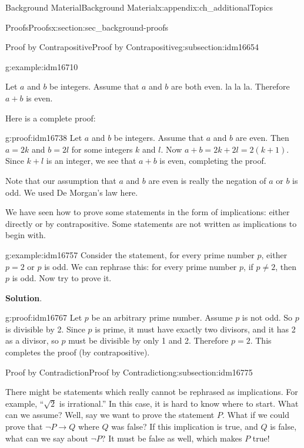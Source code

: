 \documentclass[oneside,10pt,]{book}
\numberwithin{equation}{chapter}
\def\imp{\rightarrow}
\begin{document}
\begin{appendixptx}{Background Material}{}{Background Material}{}{}{x:appendix:ch_additionalTopics}
\begin{sectionptx}{Proofs}{}{Proofs}{}{}{x:section:sec_background-proofs}
\begin{subsectionptx}{Proof by Contrapositive}{}{Proof by Contrapositive}{}{}{g:subsection:idm16654}
\begin{example}{}{g:example:idm16710}
\par
Let \(a\) and \(b\) be integers. Assume that \(a\) and \(b\) are both even. la la la. Therefore \(a+b\) is even.%
\par
Here is a complete proof:%
\begin{proofptx}{}{g:proof:idm16738}
Let \(a\) and \(b\) be integers. Assume that \(a\) and \(b\) are even. Then \(a = 2k\) and \(b = 2l\) for some integers \(k\) and \(l\). Now \(a + b = 2k + 2l = 2(k+1)\). Since \(k + l\) is an integer, we see that \(a + b\) is even, completing the proof.%
\end{proofptx}
Note that our assumption that \(a\) and \(b\) are even is really the negation of \(a\) or \(b\) is odd. We used De Morgan's law here.%
\end{example}
We have seen how to prove some statements in the form of implications: either directly or by contrapositive. Some statements are not written as implications to begin with.%
\begin{example}{}{g:example:idm16757}%
Consider the statement, for every prime number \(p\), either \(p = 2\) or \(p\) is odd. We can rephrase this: for every prime number \(p\), if \(p \ne 2\), then \(p\) is odd. Now try to prove it.%
\par\smallskip%
\noindent\textbf{Solution}.\hypertarget{g:solution:idm16766}{}\quad{}\begin{proofptx}{}{g:proof:idm16767}
Let \(p\) be an arbitrary prime number. Assume \(p\) is not odd. So \(p\) is divisible by 2. Since \(p\) is prime, it must have exactly two divisors, and it has 2 as a divisor, so \(p\) must be divisible by only 1 and 2. Therefore \(p = 2\). This completes the proof (by contrapositive).%
\end{proofptx}
\end{example}
\end{subsectionptx}
%
%
\typeout{************************************************}
\typeout{************************************************}
%
\begin{subsectionptx}{Proof by Contradiction}{}{Proof by Contradiction}{}{}{g:subsection:idm16775}
%
\par
There might be statements which really cannot be rephrased as implications. For example, ``\(\sqrt 2\) is irrational.'' In this case, it is hard to know where to start. What can we assume? Well, say we want to prove the statement \(P\). What if we could prove that \(\neg P \imp Q\) where \(Q\) was false? If this implication is true, and \(Q\) is false, what can we say about \(\neg P\)? It must be false as well, which makes \(P\) true!%

\end{subsectionptx}
\end{sectionptx}
\end{appendixptx}
\end{document}
